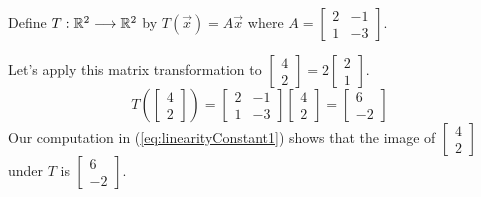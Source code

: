 \documentclass{ximera}
\begin{document}
\begin{exploration}\label{exp:linearityConstant}
    Define $T:\mathbb{R}^2\longrightarrow\mathbb{R}^2$ by $T(\vec{x})=A\vec{x}$ where $A=\begin{bmatrix}2&-1\\1&-3\end{bmatrix}$.

    Let's apply this matrix transformation to $\begin{bmatrix}4\\2\end{bmatrix}=2\begin{bmatrix}2\\1\end{bmatrix}$.
\begin{equation}\label{eq:linearityConstant1}
T\left(\begin{bmatrix}4\\2\end{bmatrix}\right)=\begin{bmatrix}2&-1\\1&-3\end{bmatrix}\begin{bmatrix}4\\2\end{bmatrix}=\begin{bmatrix}6\\-2\end{bmatrix}
\end{equation}
Our computation in (\ref{eq:linearityConstant1}) shows that the image of $\begin{bmatrix}4\\2\end{bmatrix}$ under $T$ is $\begin{bmatrix}6\\-2\end{bmatrix}$.


\end{exploration}
\end{document}
